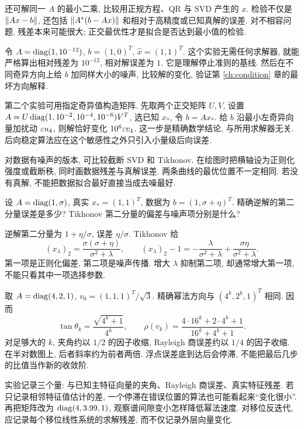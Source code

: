 还可解同一 $A$ 的最小二乘, 比较用正规方程、QR 与 SVD 产生的 $x$. 检验不仅是 $\lVert Ax-b\rVert$, 还包括 $\lVert A^*(b-Ax)\rVert$ 和相对于高精度或已知真解的误差. 对不相容问题, 残差本来可能很大; 正交最优性才是拟合是否达到最小值的检验.

令 $A=\operatorname{diag}(1,10^{-12})$, $b=(1,0)^T$, $\widehat x=(1,1)^T$. 这个实验无需任何求解器, 就能严格算出相对残差为 $10^{-12}$, 相对解误差为 $1$. 它是理解停止准则的基线. 然后在不同奇异方向上给 $b$ 加同样大小的噪声, 比较解的变化, 验证第 \ref{ch:condition} 章的最坏方向解释.

第二个实验可用指定奇异值构造矩阵. 先取两个正交矩阵 $U,V$, 设置 $A=U\operatorname{diag}(1,10^{-2},10^{-4},10^{-6})V^T$, 选已知 $x_*$, 令 $b=Ax_*$. 给 $b$ 沿最小左奇异向量加扰动 $\varepsilon u_4$, 则解恰好变化 $10^6\varepsilon v_4$. 这一步是精确数学结论, 与所用求解器无关. 后向稳定算法应在这个敏感性之外只引入小量级后向误差.

对数据有噪声的版本, 可比较截断 SVD 和 Tikhonov. 在绘图时把横轴设为正则化强度或截断秩, 同时画数据残差与真解误差. 两条曲线的最优位置不一定相同. 若没有真解, 不能把数据拟合最好直接当成去噪最好.

\begin{example}
设 $A=\operatorname{diag}(1,\sigma)$, 真实 $x_*=(1,1)^T$, 数据为 $b=(1,\sigma+\eta)^T$. 精确逆解的第二分量误差是多少? Tikhonov 第二分量的偏差与噪声项分别是什么?
\end{example}
\begin{solution}
逆解第二分量为 $1+\eta/\sigma$, 误差 $\eta/\sigma$. Tikhonov 给
\[
(x_\lambda)_2=\frac{\sigma(\sigma+\eta)}{\sigma^2+\lambda},\qquad
(x_\lambda)_2-1=-\frac{\lambda}{\sigma^2+\lambda}
+\frac{\sigma\eta}{\sigma^2+\lambda}.
\]
第一项是正则化偏差, 第二项是噪声传播. 增大 $\lambda$ 抑制第二项, 却通常增大第一项, 不能只看其中一项选择参数.
\end{solution}

取 $A=\operatorname{diag}(4,2,1)$, $v_0=(1,1,1)^T/\sqrt3$. 精确幂法方向与 $(4^k,2^k,1)^T$ 相同. 因而
\[
\tan\theta_k=\frac{\sqrt{4^k+1}}{4^k},\qquad
\rho(v_k)=\frac{4\cdot16^k+2\cdot4^k+1}{16^k+4^k+1}.
\]
对足够大的 $k$, 夹角约以 $1/2$ 的因子收缩, Rayleigh 商误差约以 $1/4$ 的因子收缩. 在半对数图上, 后者斜率约为前者两倍. 浮点误差底到达后会停滞, 不能把最后几步的比值当作新的收敛阶.

实验记录三个量: 与已知主特征向量的夹角、Rayleigh 商误差、真实特征残差. 若只记录相邻特征值估计的差, 一个停滞在错误位置的算法也可能看起来“变化很小”. 再把矩阵改为 $\operatorname{diag}(4,3.99,1)$, 观察谱间隙变小怎样降低幂法速度. 对移位反迭代, 应记录每个移位线性系统的求解残差, 而不仅记录外层向量变化.

